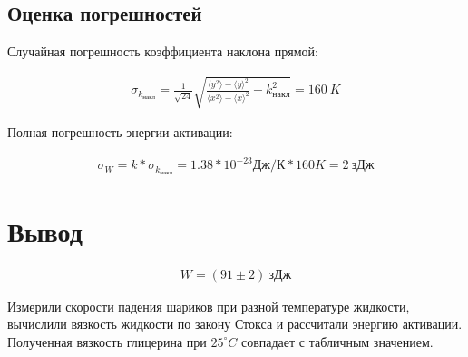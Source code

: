 \documentclass[a4paper, 12pt]{article}
\begin{document}
    \subsection{Оценка погрешностей}

    Случайная погрешность коэффициента наклона прямой:

    \begin{align*}
        \sigma_{k_{накл}} = \frac{1}{\sqrt{24}} \sqrt{\frac{\langle y^2 \rangle - {\langle y \rangle}^2}{\langle x^2 \rangle - {\langle x \rangle}^2} - k_{накл}^2} = 160~K
    \end{align*}

    Полная погрешность энергии активации:

    \begin{align*}
        \sigma_{W} = k * \sigma_{k_{накл}} = 1.38 * 10^{-23} Дж/К * 160 K = 2~зДж
    \end{align*}

    \section{Вывод}

    \begin{align*}
        W = (91 \pm 2)~зДж
    \end{align*}

    Измерили скорости падения шариков при разной температуре жидкости, вычислили вязкость жидкости по закону Стокса и рассчитали энергию активации. Полученная вязкость глицерина при $25^\circ C$ совпадает с табличным значением.
\end{document}
